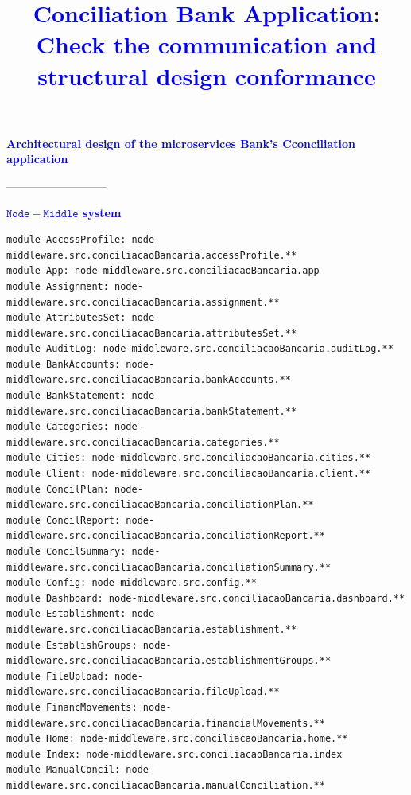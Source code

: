\documentclass[12pt]{article}
\title{\textcolor{blue}{Conciliation Bank Application}:\\{\large \textcolor{blue}{Check the communication and structural design conformance}}}
\newcommand*{\mcode}[1]{%
$\mathtt{#1}$%
}
\begin{document}
 
\sloppy
\maketitle

\vspace{-0.3cm}
\noindent\textbf{\large{\textcolor{blue}{Architectural design of the microservices Bank's Cconciliation application}}}
\label{sec:Estruturaltodos}

---------------------------


\noindent\textbf{\textcolor{blue}{\mcode{{Node}{-}{Middle}} system}}
\label{sec:ApendiceAudit}

\label{apend:especArquiteturalNodeMiddle}

\begin{lstlisting}[style=colorido, caption={Especificação do Projeto Arquitetural do orquestrador Node-Middle.},label={list:especArquiteturalNodeMiddle}
]
module AccessProfile: node-middleware.src.conciliacaoBancaria.accessProfile.**
module App: node-middleware.src.conciliacaoBancaria.app
module Assignment: node-middleware.src.conciliacaoBancaria.assignment.**
module AttributesSet: node-middleware.src.conciliacaoBancaria.attributesSet.**
module AuditLog: node-middleware.src.conciliacaoBancaria.auditLog.**
module BankAccounts: node-middleware.src.conciliacaoBancaria.bankAccounts.**
module BankStatement: node-middleware.src.conciliacaoBancaria.bankStatement.**
module Categories: node-middleware.src.conciliacaoBancaria.categories.**
module Cities: node-middleware.src.conciliacaoBancaria.cities.**
module Client: node-middleware.src.conciliacaoBancaria.client.**
module ConcilPlan: node-middleware.src.conciliacaoBancaria.conciliationPlan.**
module ConcilReport: node-middleware.src.conciliacaoBancaria.conciliationReport.**
module ConcilSummary: node-middleware.src.conciliacaoBancaria.conciliationSummary.**
module Config: node-middleware.src.config.**
module Dashboard: node-middleware.src.conciliacaoBancaria.dashboard.**
module Establishment: node-middleware.src.conciliacaoBancaria.establishment.**
module EstablishGroups: node-middleware.src.conciliacaoBancaria.establishmentGroups.**
module FileUpload: node-middleware.src.conciliacaoBancaria.fileUpload.**
module FinancMovements: node-middleware.src.conciliacaoBancaria.financialMovements.**
module Home: node-middleware.src.conciliacaoBancaria.home.**
module Index: node-middleware.src.conciliacaoBancaria.index
module ManualConcil: node-middleware.src.conciliacaoBancaria.manualConciliation.**

\end{lstlisting}
\end{document}
